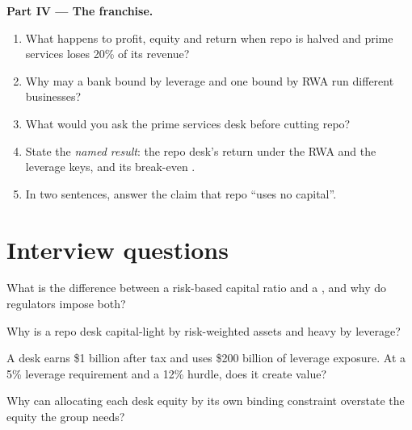 \begin{problem}
\medskip\noindent\textbf{Part IV --- The franchise.}
\begin{enumerate}[resume]
\item What happens to profit, equity and return when repo is halved and prime services loses 20\% of its revenue?
\item Why may a bank bound by leverage and one bound by RWA run different businesses?
\item What would you ask the prime services desk before cutting repo?
\item State the \emph{named result}: the repo desk's return under the RWA and the leverage keys, and its break-even .
\item In two sentences, answer the claim that repo ``uses no capital''.
\end{enumerate}
\end{problem}

\section{Interview questions}

\begin{interviewq}\label{iq:fm:the-bank-markets-division:1}
What is the difference between a risk-based capital ratio and a , and why do regulators impose both?
\end{interviewq}

\begin{interviewq}\label{iq:fm:the-bank-markets-division:2}
Why is a repo desk capital-light by risk-weighted assets and heavy by leverage?
\end{interviewq}

\begin{interviewq}\label{iq:fm:the-bank-markets-division:3}
A desk earns \$1 billion after tax and uses \$200 billion of leverage exposure. At a 5\% leverage requirement and a 12\% hurdle, does it create
value?
\end{interviewq}

\begin{interviewq}\label{iq:fm:the-bank-markets-division:4}
Why can allocating each desk equity by its own binding constraint overstate the equity the group needs?
\end{interviewq}

